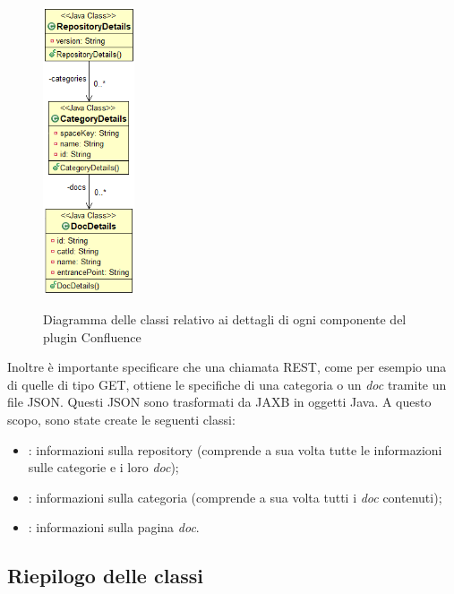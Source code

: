\begin{figure}[H]
    \centering
    \includegraphics[width=0.24\textwidth]{immagini/details.png}\\
    \caption{Diagramma delle classi relativo ai dettagli di ogni componente del plugin Confluence}
\end{figure}

Inoltre è importante specificare che una chiamata REST, come per esempio una di quelle di tipo GET, ottiene le specifiche di una categoria o un \emph{doc} tramite un file JSON.
Questi JSON sono trasformati da JAXB in oggetti Java.
A questo scopo, sono state create le seguenti classi:
\begin{itemize}
    \item {}: informazioni sulla repository (comprende a sua volta tutte le informazioni sulle categorie e i loro \emph{doc});
    \item {}: informazioni sulla categoria (comprende a sua volta tutti i \emph{doc} contenuti);
    \item {}: informazioni sulla pagina \emph{doc}.
\end{itemize}

\clearpage

    \subsection{Riepilogo delle classi}

